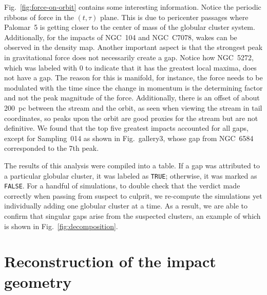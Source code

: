 \documentclass{aa}
\begin{document}
\begin{appendix}
    Fig.~\ref{fig:force-on-orbit} contains some interesting information. Notice the periodic ribbons of force in the $(t,\tau)$ plane. This is due to pericenter passages where Palomar~5 is getting closer to the center of mass of the globular cluster system. Additionally, for the impacts of NGC~104 and NGC~C7078, wakes can be observed in the density map. Another important aspect is that the strongest peak in gravitational force does not necessarily create a gap. Notice how NGC~5272, which was labeled with 0 to indicate that it has the greatest local maxima, does not have a gap. The reason for this is manifold, for instance, the force needs to be modulated with the time since the change in momentum is the determining factor and not the peak magnitude of the force.  Additionally, there is an offset of about 200~pc between the stream and the orbit, as seen when viewing the stream in tail coordinates, so peaks upon the orbit are good proxies for the stream but are not definitive. We found that the top five greatest impacts accounted for all gaps, except for Sampling~014 as shown in Fig.~gallery3, whose gap from NGC~6584 corresponded to the 7th peak. 

    The results of this analysis were compiled into a table. If a gap was attributed to a particular globular cluster, it was labeled as \texttt{TRUE}; otherwise, it was marked as \texttt{FALSE}. For a handful of simulations, to double check that the verdict made correctly when passing from suspect to culprit, we re-compute the simulations yet individually adding one globular cluster at a time. As a result, we are able to confirm that singular gaps arise from the suspected clusters, an example of which is shown in Fig.~\ref{fig:decomposition}. 



    \section{Reconstruction of the impact geometry} \label{sec:reconstruction}


\end{appendix}
\end{document}
